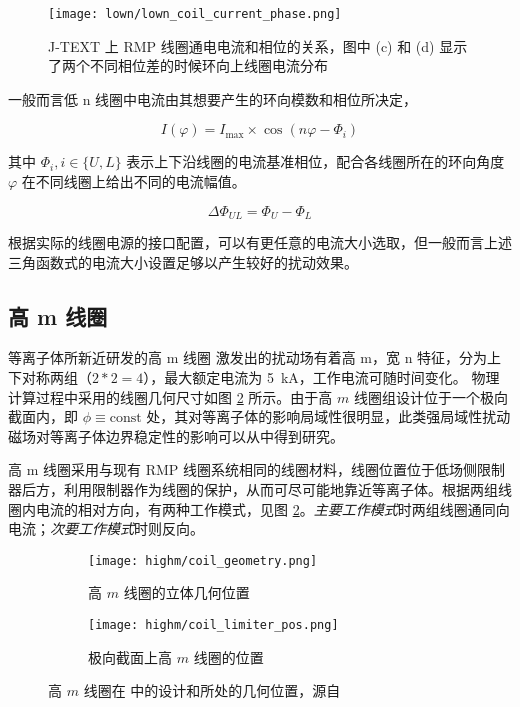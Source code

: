   
\begin{figure}[htbp]
  \centering%
      \texttt{[image: lown/lown\_coil\_current\_phase.png]}
      \caption{J-TEXT 上 RMP 线圈通电电流和相位的关系，图中 (c) 和 (d) 显示了两个不同相位差的时候环向上线圈电流分布}
      \label{fig:lown_current}
\end{figure}


一般而言低 n 线圈中电流由其想要产生的环向模数和相位所决定，

\begin{equation}
I(\varphi)=I_{\max } \times \cos \left(n \varphi-\Phi_{i}\right)
\end{equation}

其中 $\Phi_i, i\in \{U,L\}$ 表示上下沿线圈的电流基准相位，配合各线圈所在的环向角度 $\varphi$ 在不同线圈上给出不同的电流幅值。

\begin{equation}
\Delta \Phi_{UL} = \Phi_U - \Phi_L
\end{equation}

根据实际的线圈电源的接口配置，可以有更任意的电流大小选取，但一般而言上述三角函数式的电流大小设置足够以产生较好的扰动效果。

\subsection{高 m 线圈}
等离子体所新近研发的高 m 线圈  激发出的扰动场有着高 m，宽 n 特征，分为上下对称两组（$2*2=4$），最大额定电流为 \SI{5}{\kilo\ampere}，工作电流可随时间变化。 
物理计算过程中采用的线圈几何尺寸如图 \ref{fig:highm-pos} 所示。由于高 $m$ 线圈组设计位于一个极向截面内，即 $\phi\equiv \text{const}$ 处，其对等离子体的影响局域性很明显，此类强局域性扰动磁场对等离子体边界稳定性的影响可以从中得到研究。

高 m 线圈采用与现有 RMP 线圈系统相同的线圈材料，线圈位置位于低场侧限制器后方，利用限制器作为线圈的保护，从而可尽可能地靠近等离子体。根据两组线圈内电流的相对方向，有两种工作模式，见图 \ref{fig:highm-pos}。\textit{主要工作模式}时两组线圈通同向电流；\textit{次要工作模式}时则反向。


\begin{figure}[htbp]
    \centering%
    \begin{subfigure}{0.45\textwidth}
      \texttt{[image: highm/coil\_geometry.png]}
      \caption{高 $m$ 线圈的立体几何位置}
    \end{subfigure}
    \begin{subfigure}{0.45\textwidth}
      \texttt{[image: highm/coil\_limiter\_pos.png]}
      \caption{极向截面上高 $m$ 线圈的位置}
    \end{subfigure}
    \caption{高 $m$ 线圈在 \east 中的设计和所处的几何位置，源自 \cite{zhang_highm}}
    \label{fig:highm-pos}
  \end{figure}










